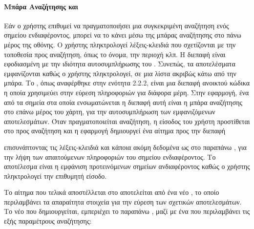 \paragraph{Μπάρα Αναζήτησης και }
\paragraph{}
Εάν ο χρήστης επιθυμεί να πραγματοποιήσει μια συγκεκριμένη αναζήτηση ενός σημείου ενδιαφέροντος, μπορεί να το κάνει μέσω της μπάρας αναζήτησης στο πάνω μέρος της οθόνης. Ο χρήστης πληκτρολογεί λέξεις-κλειδιά που σχετίζονται με την τοποθεσία προς αναζήτηση, όπως το όνομα, την περιοχή κλπ. Η διεπαφή είναι εφοδιασμένη με την ιδιότητα αυτοσυμπλήρωσης του . Συνεπώς, τα αποτελέσματα εμφανίζονται καθώς ο χρήστης πληκτρολογεί, σε μια λίστα ακριβώς κάτω από την μπάρα. 
\newline
\indent
 Το , όπως αναφέρθηκε στην ενότητα 2.2.2, είναι μια διεπαφή ανοικτού κώδικα η οποία χρησιμεύει στην εύρεση πληροφοριών για διάφορα μέρη. Στην εφαρμογή, ένα από τα σημεία στα οποία ενσωματώνεται η διεπαφή αυτή είναι η μπάρα αναζήτησης στο επάνω μέρος του χάρτη, για την αυτοσυμπλήρωση των εμφανιζόμενων αποτελεσμάτων. Όταν πραγματοποιείται αναζήτηση, η είσοδος του χρήστη προστίθεται στο προς αναζήτηση  και η εφαρμογή δημιουργεί ένα αίτημα  προς την διεπαφή 
 
\hfill
\begin{mdframed}[backgroundcolor=lightgrey] 
\end{mdframed}
\hfil

\noindent  επισυνάπτοντας τις λέξεις-κλειδιά και κάποια ακόμη δεδομένα ως  στο παραπάνω , για την λήψη των απαιτούμενων πληροφοριών του σημείου ενδιαφέροντος. Το αποτέλεσμα είναι η εμφάνιση προτεινόμενων σημείων ανδιαφέροντος καθώς ο χρήστης πληκτρολογεί την επιθυμητή είσοδο.  

Το αίτημα που τελικά αποστέλλεται στο  αποτελείται από ένα νέο , το οποίο περιλαμβάνει τα απαραίτητα στοιχεία για την εύρεση των σχετικών αποτελεσμάτων. Το νέο  που δημιουργείται, εμπεριέχει το παραπάνω , μαζί με ένα  που περιλαμβάνει τις εξής παραμέτρους αναζήτησης:

